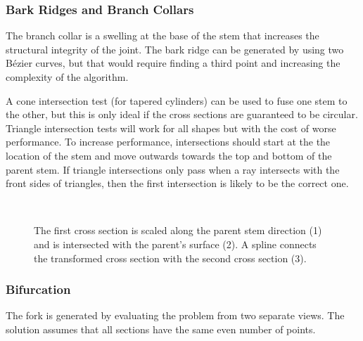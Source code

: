 \documentclass[10pt]{article}
\begin{document}
\subsubsection{Bark Ridges and Branch Collars}

\begin{minipage}[t]{0.46\textwidth}
The branch collar is a swelling at the base of the stem that increases the structural integrity of the joint. The bark ridge can be generated by using two B\'{e}zier curves, but that would require finding a third point and increasing the complexity of the algorithm.

\setlength{\parindent}{1.5em}
A cone intersection test (for tapered cylinders) can be used to fuse one stem to the other, but this is only ideal if the cross sections are guaranteed to be circular. Triangle intersection tests will work for all shapes but with the cost of worse performance. To increase performance, intersections should start at the the location of the stem and move outwards towards the top and bottom of the parent stem. If triangle intersections only pass when a ray intersects with the front sides of triangles, then the first intersection is likely to be the correct one.

\end{minipage}
\hfill
\begin{minipage}[t]{0.46\textwidth}
 \begin{figure}[H]
  \centering
   \\
  \caption{The first cross section is scaled along the parent stem direction (1) and is intersected with the parent's surface (2). A spline connects the transformed cross section with the second cross section (3).}
 \end{figure}
\end{minipage}

\subsubsection{Bifurcation}

The fork is generated by evaluating the problem from two separate views. The solution assumes that all sections have the same even number of points.
\end{document}
